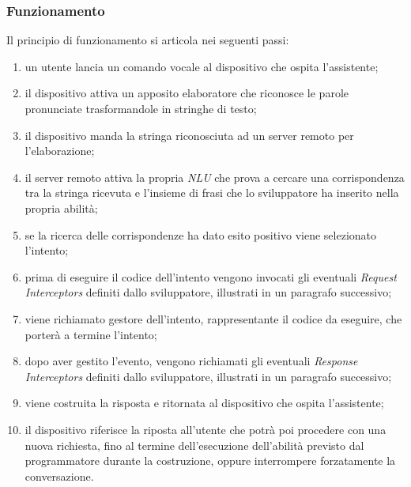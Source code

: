 		\subsubsection{Funzionamento}
		Il principio di funzionamento si articola nei seguenti passi:
		\begin{enumerate}
			\item un utente lancia un comando vocale al dispositivo che ospita l'assistente;
			\item il dispositivo attiva un apposito elaboratore che riconosce le parole pronunciate trasformandole in stringhe di testo;
			\item il dispositivo manda la stringa riconosciuta ad un server remoto per l'elaborazione;
			\item il server remoto attiva la propria \textit{NLU} che prova a cercare una corrispondenza tra la stringa ricevuta e l'insieme di frasi che lo sviluppatore ha inserito nella propria abilità;
			\item se la ricerca delle corrispondenze ha dato esito positivo viene selezionato l'intento;
			\item prima di eseguire il codice dell'intento vengono invocati gli eventuali \textit{Request Interceptors} definiti dallo sviluppatore, illustrati in un paragrafo successivo;
			\item viene richiamato gestore dell'intento, rappresentante il codice da eseguire, che porterà a termine l'intento;
			\item dopo aver gestito l'evento, vengono richiamati gli eventuali \textit{Response Interceptors} definiti dallo sviluppatore, illustrati in un paragrafo successivo;
			\item viene costruita la risposta e ritornata al dispositivo che ospita l'assistente;
			\item il dispositivo riferisce la riposta all'utente che potrà poi procedere con una nuova richiesta, fino al termine dell'esecuzione dell'abilità previsto dal programmatore durante la costruzione, oppure interrompere forzatamente la conversazione.
		\end{enumerate}

